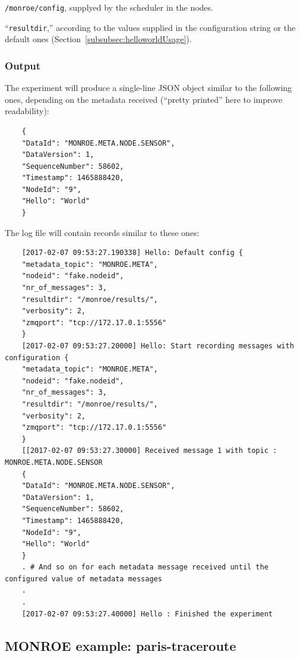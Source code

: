 \documentclass[a4paper,10pt]{article}
\newcommand{\VerbatimFont}{\footnotesize}
\newcommand{\monroe}{MONROE}
\newcommand{\identifier}[1]{{\texttt{\small{#1}}}}
\begin{document}
\begin{itemize*}
	\item \identifier{/monroe/config}, supplyed by the scheduler in the nodes.
	\item ``\identifier{resultdir},'' according to the values supplied in the configuration string or the default ones (Section~\ref{subsubsec:helloworldUsage}).
\end{itemize*}

\subsubsection{Output}

The experiment will produce a single-line JSON object similar to the following ones, depending on the metadata received (``pretty printed'' here to improve readability):

{\VerbatimFont
	\begin{verbatim}
	{
	"DataId": "MONROE.META.NODE.SENSOR",
	"DataVersion": 1,
	"SequenceNumber": 58602,
	"Timestamp": 1465888420,
	"NodeId": "9",
	"Hello": "World"
	}
	\end{verbatim}}

\noindent The log file will contain records similar to these ones:

{\VerbatimFont
	\begin{verbatim}
	[2017-02-07 09:53:27.190338] Hello: Default config {
	"metadata_topic": "MONROE.META", 
	"nodeid": "fake.nodeid", 
	"nr_of_messages": 3, 
	"resultdir": "/monroe/results/", 
	"verbosity": 2, 
	"zmqport": "tcp://172.17.0.1:5556"
	}
	[2017-02-07 09:53:27.20000] Hello: Start recording messages with configuration {
	"metadata_topic": "MONROE.META", 
	"nodeid": "fake.nodeid", 
	"nr_of_messages": 3, 
	"resultdir": "/monroe/results/", 
	"verbosity": 2, 
	"zmqport": "tcp://172.17.0.1:5556"
	}
	[[2017-02-07 09:53:27.30000] Received message 1 with topic : MONROE.META.NODE.SENSOR
	{
	"DataId": "MONROE.META.NODE.SENSOR",
	"DataVersion": 1,
	"SequenceNumber": 58602,
	"Timestamp": 1465888420,
	"NodeId": "9",
	"Hello": "World"
	}
	. # And so on for each metadata message received until the configured value of metadata messages
	.
	.
	[2017-02-07 09:53:27.40000] Hello : Finished the experiment
	\end{verbatim}}


\subsection{\monroe{} example: paris-traceroute}
\end{document}
